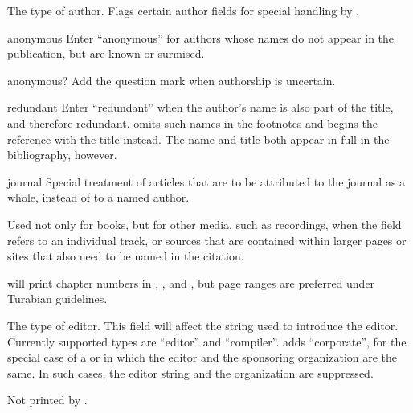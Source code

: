 \documentclass{ltxdockit}[2010/02/12]
\begin{document}
\begin{fieldlist}

%


The type of author. Flags certain author fields for special handling by .	   
\begin{valuelist}
\item [anonymous] Enter ``anonymous'' for authors whose names do not appear in the publication, but are known or surmised.
\item[anonymous?] Add the question mark when authorship is uncertain.
\item [redundant] Enter ``redundant'' when the author's name is also part of the title, and therefore redundant.  omits such names in the footnotes and begins the reference with the title instead. The name and title both appear in full in the bibliography, however.
\item[journal] Special treatment of articles that are to be attributed to the journal as a whole, instead of to a named author.
\end{valuelist}

Used not only for books, but for other media, such as recordings, when the  field refers to an individual track, or  sources that are contained within larger pages or sites that also need to be named in the citation.


 will print chapter numbers in , , and , but page ranges are preferred under Turabian guidelines.


The type of editor. This field will affect the string used to introduce the editor. Currently supported types are \enquote{editor} and \enquote{compiler}.  adds \enquote{corporate}, for the special case of a  or  in which the editor and the sponsoring organization are the same. In such cases, the editor string and the organization are suppressed.


Not printed by .



\end{fieldlist}
\end{document}
